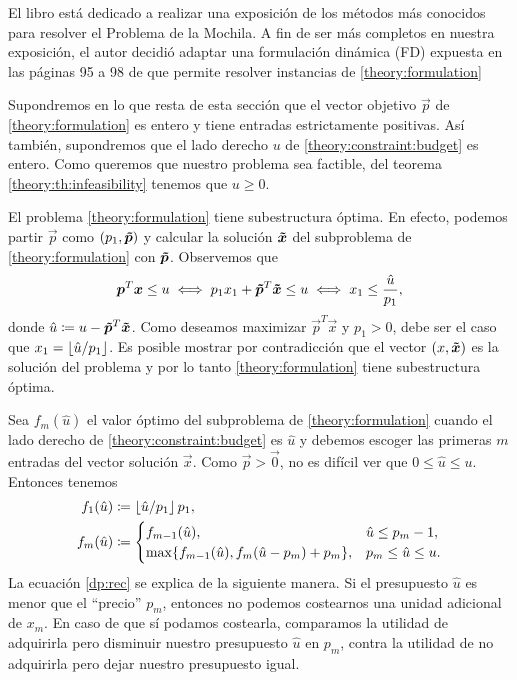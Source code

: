 El libro \cite{martello} está dedicado a realizar una exposición de los métodos más conocidos para
resolver el Problema de la Mochila. A fin de ser más completos en nuestra exposición, el autor
decidió adaptar una formulación dinámica (FD) expuesta en las páginas 95 a 98 de \cite{martello} que
permite resolver instancias de \eqref{theory:formulation}

Supondremos en lo que resta de esta sección que el vector objetivo $\vec{p}$ de \eqref{theory:formulation} es
entero y tiene entradas estrictamente positivas. Así también, supondremos que el lado derecho $u$ de
\eqref{theory:constraint:budget} es entero. Como queremos que nuestro problema sea factible, del
teorema \ref{theory:th:infeasibility} tenemos que $u \geq 0$.

El problema \eqref{theory:formulation} tiene subestructura óptima. En efecto, podemos partir
$\vec{p}$ como
$(p_1, \boldsymbol{\tilde{p}})$ y calcular la solución $\boldsymbol{\tilde{x}}$ del subproblema de
\eqref{theory:formulation} con $\boldsymbol{\tilde{p}}$. Observemos que
\begin{equation*}
	\boldsymbol{p}^T\boldsymbol{x} \leq u \iff p_1x_1 + \boldsymbol{\tilde{p}}^T\boldsymbol{\tilde{x}} \leq u \iff x_1 \leq
	\frac{\hat{u}}{p_1},
\end{equation*}
donde $\hat{u} \coloneq u - \boldsymbol{\tilde{p}}^T\boldsymbol{\tilde{x}}$. Como deseamos maximizar
$\vec{p}^T\vec{x}$ y $p_1 > 0$, debe ser el caso que $x_1 = \left\lfloor \hat{u}/p_1 \right\rfloor$. Es posible mostrar
por contradicción que el vector $(x, \boldsymbol{\tilde{x}})$ es la solución del problema y por lo tanto
\eqref{theory:formulation} tiene subestructura óptima.

Sea $f_m(\hat{u})$ el valor óptimo del subproblema de \eqref{theory:formulation} cuando el
lado derecho de \eqref{theory:constraint:budget} es $\hat{u}$ y debemos escoger las
primeras $m$ entradas del vector solución $\vec{x}$. Como $\vec{p} > \vec{0}$, no es difícil ver que $0 \leq
\hat{u} \leq u$. Entonces tenemos
\begin{subequations}
	\begin{align}
		\label{formulation:dp}
		f_1(\hat{u}) &\coloneq \left\lfloor \hat{u}/p_1 \right\rfloor p_1, \\
		f_m(\hat{u}) &\coloneq \begin{cases}
			f_{m-1}(\hat{u}), & \hat{u} \leq p_m - 1, \\
			\max\lbrace f_{m - 1}(\hat{u}), f_{m}(\hat{u} - p_m) + p_m \rbrace, & p_m \leq \hat{u} \leq u.
			\label{dp:rec}
		\end{cases}
	\end{align}
\end{subequations}
La ecuación \eqref{dp:rec} se explica de la siguiente manera. Si el presupuesto $\hat{u}$ es menor
que el ``precio'' $p_m$, entonces no podemos costearnos una unidad adicional de $x_m$. En caso de que sí
podamos costearla, comparamos la utilidad de adquirirla pero disminuir nuestro
presupuesto $\hat{u}$ en $p_m$, contra la utilidad de no adquirirla pero dejar nuestro presupuesto
igual.

